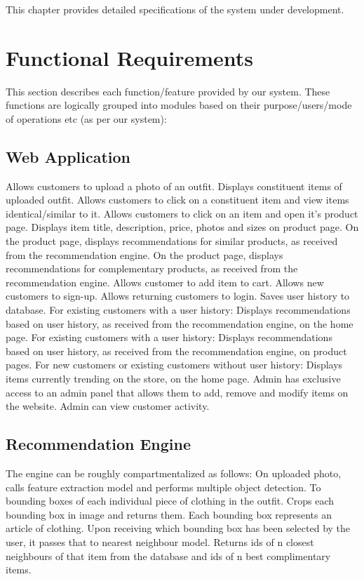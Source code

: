 This chapter provides detailed specifications of the system under development.

\section{Functional Requirements}

This section describes each function/feature provided by our system. These functions are logically grouped into modules based on their purpose/users/mode of operations etc (as per our system):
\begin{outline}
  \subsection{Web Application}
  \1 Allows customers to upload a photo of an outfit.
  \1 Displays constituent items of uploaded outfit.
  \1 Allows customers to click on a constituent item and view items identical/similar to it.
  \1 Allows customers to click on an item and open it's product page.
  \1 Displays item title, description, price, photos and sizes on product page.
  \1 On the product page, displays recommendations for similar products, as received from the recommendation engine.
  \1 On the product page, displays recommendations for complementary products, as received from the recommendation engine.
  \1 Allows customer to add item to cart.
  \1 Allows new customers to sign-up.
  \1 Allows returning customers to login.
  \1 Saves user history to database.
  \1 For existing customers with a user history: Displays recommendations based on user history, as received from the recommendation engine, on the home page.
  \1 For existing customers with a user history: Displays recommendations based on user history, as received from the recommendation engine, on product pages.
  \1 For new customers or existing customers without user history: Displays items currently trending on the store, on the home page.
  \1 Admin has exclusive access to an admin panel that allows them to add, remove and modify items on the website. 
  \1 Admin can view customer activity.
\end{outline}
\begin{outline}
  \subsection{Recommendation Engine}
  The engine can be roughly compartmentalized as follows:
  \1 On uploaded photo, calls feature extraction model and performs multiple object detection. To bounding boxes of each individual piece of clothing in the outfit.
  \1 Crops each bounding box in image and returns them. Each bounding box represents an article of clothing.
  \1 Upon receiving which bounding box has been selected by the user, it passes that to nearest neighbour model. Returns ids of n closest neighbours of that item from the database and ids of n best complimentary items.
\end{outline}
